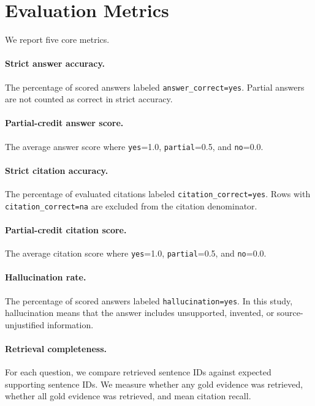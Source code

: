 \documentclass[10pt,twocolumn]{article}
\begin{document}
\section{Evaluation Metrics}

We report five core metrics.

\paragraph{Strict answer accuracy.}
The percentage of scored answers labeled \texttt{answer\_correct=yes}. Partial answers are not counted as correct in strict accuracy.

\paragraph{Partial-credit answer score.}
The average answer score where \texttt{yes}=1.0, \texttt{partial}=0.5, and \texttt{no}=0.0.

\paragraph{Strict citation accuracy.}
The percentage of evaluated citations labeled \texttt{citation\_correct=yes}. Rows with \texttt{citation\_correct=na} are excluded from the citation denominator.

\paragraph{Partial-credit citation score.}
The average citation score where \texttt{yes}=1.0, \texttt{partial}=0.5, and \texttt{no}=0.0.

\paragraph{Hallucination rate.}
The percentage of scored answers labeled \texttt{hallucination=yes}. In this study, hallucination means that the answer includes unsupported, invented, or source-unjustified information.

\paragraph{Retrieval completeness.}
For each question, we compare retrieved sentence IDs against expected supporting sentence IDs. We measure whether any gold evidence was retrieved, whether all gold evidence was retrieved, and mean citation recall.
\end{document}
